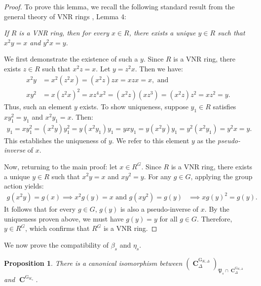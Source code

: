 \documentclass{amsart}
\newtheorem{proposition}{Proposition}[section]
\DeclareMathOperator{\C}{\textbf{C}}
\DeclareMathOperator{\G}{G}
\begin{document}
\begin{proof}
    To prove this lemma, we recall the following standard result from the general theory of VNR rings \cite{Rap}, Lemma 4:
    
    \begin{center}
    \emph{If $R$ is a VNR ring, then for every $x \in R$, there exists a unique $y \in R$ such that $x^2y = x$ and $y^2x = y$.}
    \end{center}
    
    We first demonstrate the existence of such a $y$. Since $R$ is a VNR ring, there exists $z \in R$ such that $x^2z = x$. Let $y = z^2x$. Then we have:
    \begin{align*}
        x^2y &= x^2(z^2x) = (x^2z)zx = xzx = x, \text{ and} \\
        xy^2 &= x(z^2x)^2 = xz^4x^2 = (x^2z)(xz^3) = (x^2z)z^2 = xz^2 = y.
    \end{align*}
    Thus, such an element $y$ exists. To show uniqueness, suppose $y_1 \in R$ satisfies $xy_1^2 = y_1$ and $x^2y_1 = x$. Then:
    \begin{align*}
        y_1 = xy_1^2 = (x^2y)y_1^2 = y(x^2y_1)y_1 = yxy_1 = y(x^2y)y_1 = y^2(x^2y_1) = y^2x = y.
    \end{align*}
    This establishes the uniqueness of $y$. We refer to this element $y$ as the \emph{pseudo-inverse} of $x$.

    Now, returning to the main proof: let $x \in R^G$. Since $R$ is a VNR ring, there exists a unique $y \in R$ such that $x^2y = x$ and $xy^2 = y$. For any $g \in G$, applying the group action yields:
    \begin{align*}
        g(x^2y) = g(x) \implies x^2g(y) = x
        \text{ and } g(xy^2) = g(y) &\implies xg(y)^2 = g(y).
    \end{align*}
    It follows that for every $g \in G$, $g(y)$ is also a pseudo-inverse of $x$. By the uniqueness proven above, we must have $g(y) = y$ for all $g \in G$. Therefore, $y \in R^G$, which confirms that $R^G$ is a VNR ring.
\end{proof}

We now prove the compatibility of $\beta_s$ and $\eta_s$.
\begin{proposition}
    There is a canonical isomorphism between $(\C^{\G_{K,\Delta}}_\Delta)_{\mathfrak{P}_s\cap \C^{\G_{K,\Delta}}_\Delta}$ and $\C^{\G_{K_s}}$.
\end{proposition}
\end{document}
